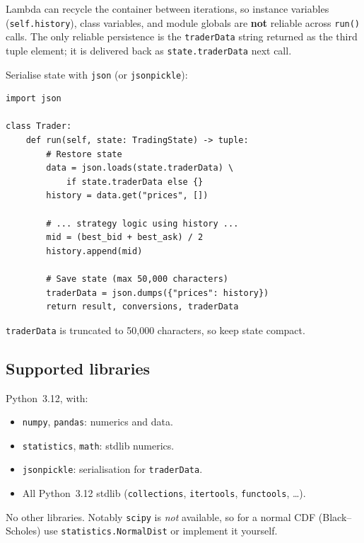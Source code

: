 \begin{pitfallbox}
Lambda can recycle the container between iterations, so instance
variables (\texttt{self.history}), class variables, and module globals
are \textbf{not} reliable across \texttt{run()} calls.  The only
reliable persistence is the \texttt{traderData} string returned as the
third tuple element; it is delivered back as \texttt{state.traderData}
next call.

Serialise state with \texttt{json} (or \texttt{jsonpickle}):
\begin{lstlisting}[numbers=none, frame=none,
  backgroundcolor=\color{red!3}]
import json

class Trader:
    def run(self, state: TradingState) -> tuple:
        # Restore state
        data = json.loads(state.traderData) \
            if state.traderData else {}
        history = data.get("prices", [])

        # ... strategy logic using history ...
        mid = (best_bid + best_ask) / 2
        history.append(mid)

        # Save state (max 50,000 characters)
        traderData = json.dumps({"prices": history})
        return result, conversions, traderData
\end{lstlisting}
\texttt{traderData} is truncated to 50{,}000 characters, so keep state
compact.
\end{pitfallbox}

\subsection{Supported libraries}

Python~3.12, with:
\begin{itemize}
  \item \texttt{numpy}, \texttt{pandas}: numerics and data.
  \item \texttt{statistics}, \texttt{math}: stdlib numerics.
  \item \texttt{jsonpickle}: serialisation for \texttt{traderData}.
  \item All Python~3.12 stdlib (\texttt{collections}, \texttt{itertools},
  \texttt{functools}, \dots).
\end{itemize}
No other libraries.  Notably \texttt{scipy} is \emph{not} available, so
for a normal CDF (Black--Scholes) use \texttt{statistics.NormalDist} or
implement it yourself.

